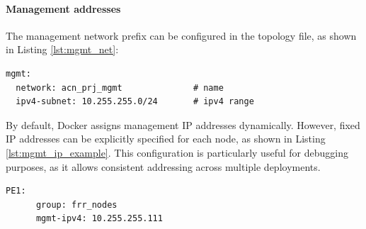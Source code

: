 \documentclass{report}
\begin{document}
\paragraph{Management addresses}
The management network prefix can be configured in the topology file, as shown in Listing \ref{lst:mgmt_net}:
\begin{lstlisting}[style=styleYml, caption=Management network, label=lst:mgmt_net,
    morekeywords={mgmt,network,ipv4-subnet}]
mgmt:
  network: acn_prj_mgmt              # name
  ipv4-subnet: 10.255.255.0/24       # ipv4 range
\end{lstlisting}
By default, Docker assigns management IP addresses dynamically. However, fixed IP addresses can be explicitly specified for each node, as shown in Listing \ref{lst:mgmt_ip_example}. This configuration is particularly useful for debugging purposes, as it allows consistent addressing across multiple deployments.
\begin{lstlisting}[style=styleYml, caption=Management IP address, label=lst:mgmt_ip_example,
    morekeywords={PE1, group, mgmt-ipv4}]
    PE1:
      group: frr_nodes
      mgmt-ipv4: 10.255.255.111
\end{lstlisting}
\end{document}
